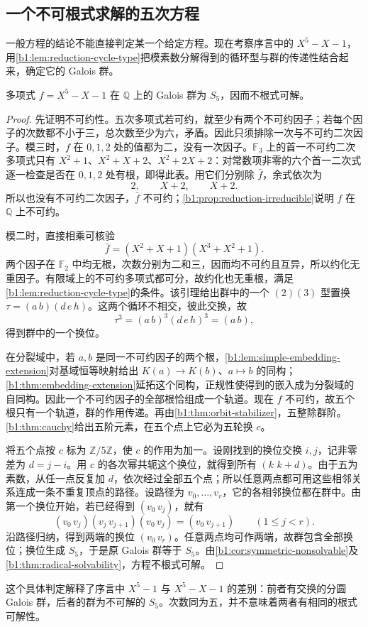 \subsection{一个不可根式求解的五次方程}
\label{b1:subsec:2103:04}

一般方程的结论不能直接判定某一个给定方程。现在考察序言中的 \(X^5-X-1\)，用\cref{b1:lem:reduction-cycle-type}把模素数分解得到的循环型与群的传递性结合起来，确定它的 Galois 群。


\begin{proposition}\label{b1:prop:quintic-x5-x-1}
	多项式 \(f=X^5-X-1\) 在 \(\mathbb Q\) 上的 Galois 群为 \(S_5\)，因而不根式可解。
\end{proposition}
\begin{proof}
	先证明不可约性。五次多项式若可约，就至少有两个不可约因子；若每个因子的次数都不小于三，总次数至少为六，矛盾。因此只须排除一次与不可约二次因子。模三时，\(f\) 在 \(0,1,2\) 处的值都为二，没有一次因子。\(\mathbb F_3\) 上的首一不可约二次多项式只有 \(X^2+1\)、\(X^2+X+2\)、\(X^2+2X+2\)：对常数项非零的六个首一二次式逐一检查是否在 \(0,1,2\) 处有根，即得此表。用它们分别除 \(\bar f\)，余式依次为
	\[
		2,\qquad X+2,\qquad X+2.
	\]
	所以也没有不可约二次因子，\(\bar f\) 不可约；\cref{b1:prop:reduction-irreducible}说明 \(f\) 在 \(\mathbb Q\) 上不可约。

	模二时，直接相乘可核验
	\[
		\bar f=(X^2+X+1)(X^3+X^2+1).
	\]
	两个因子在 \(\mathbb F_2\) 中均无根，次数分别为二和三，因而均不可约且互异，所以约化无重因子。有限域上的不可约多项式都可分，故约化也无重根，满足\cref{b1:lem:reduction-cycle-type}的条件。该引理给出群中的一个 \((2)(3)\) 型置换 \(\tau=(a\,b)(d\,e\,h)\)。这两个循环不相交，彼此交换，故
	\[
		\tau^3=(a\,b)^3(d\,e\,h)^3=(a\,b),
	\]
	得到群中的一个换位。

	在分裂域中，若 \(a,b\) 是同一不可约因子的两个根，\cref{b1:lem:simple-embedding-extension}对基域恒等映射给出 \(K(a)\to K(b)\)、\(a\mapsto b\) 的同构；\cref{b1:thm:embedding-extension}延拓这个同构，正规性使得到的嵌入成为分裂域的自同构。因此一个不可约因子的全部根恰组成一个轨道。现在 \(f\) 不可约，故五个根只有一个轨道，群的作用传递。再由\cref{b1:thm:orbit-stabilizer}，五整除群阶。\cref{b1:thm:cauchy}给出五阶元素，在五个点上它必为五轮换 \(c\)。

	将五个点按 \(c\) 标为 \(\mathbb Z/5\mathbb Z\)，使 \(c\) 的作用为加一。设刚找到的换位交换 \(i,j\)，记非零差为 \(d=j-i\)。用 \(c\) 的各次幂共轭这个换位，就得到所有 \((k\,\,k+d)\)。由于五为素数，从任一点反复加 \(d\)，依次经过全部五个点；所以任意两点都可用这些相邻关系连成一条不重复顶点的路径。设路径为 \(v_0,\ldots,v_r\)，它的各相邻换位都在群中。由第一个换位开始，若已经得到 \((v_0\,v_j)\)，就有
	\[
		(v_0\,v_j)(v_j\,v_{j+1})(v_0\,v_j)=(v_0\,v_{j+1}) \qquad(1\le j<r).
	\]
	沿路径归纳，得到两端的换位 \((v_0\,v_r)\)。任意两点均可作两端，故群包含全部换位；换位生成 \(S_5\)，于是原 Galois 群等于 \(S_5\)。由\cref{b1:cor:symmetric-nonsolvable}及\cref{b1:thm:radical-solvability}，方程不根式可解。
\end{proof}
这个具体判定解释了序言中 \(X^5-1\) 与 \(X^5-X-1\) 的差别：前者有交换的分圆 Galois 群，后者的群为不可解的 \(S_5\)。次数同为五，并不意味着两者有相同的根式可解性。

